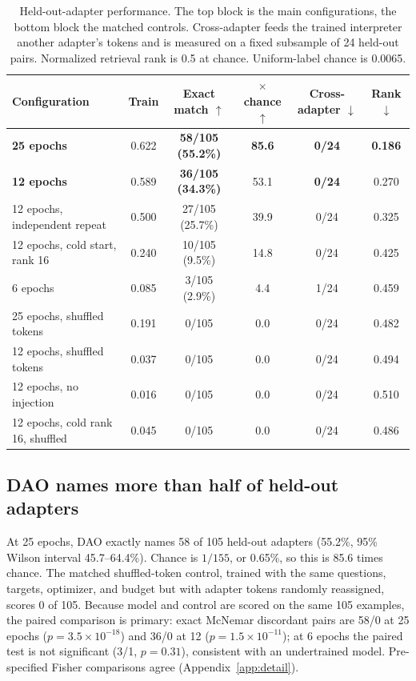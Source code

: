 \documentclass{article}
\begin{document}
\begin{table}[t]
\centering
\caption{Held-out-adapter performance. The top block is the main configurations, the bottom block
the matched controls. Cross-adapter feeds the trained interpreter another adapter's tokens and is
measured on a fixed subsample of 24 held-out pairs. Normalized retrieval rank is 0.5 at chance.
Uniform-label chance is 0.0065.}
\label{tab:main}
\small
\begin{tabular}{lccccc}
\toprule
Configuration & Train & Exact match $\uparrow$ & $\times$chance $\uparrow$ & Cross-adapter $\downarrow$ & Rank $\downarrow$ \\
\midrule
\textbf{25 epochs} & 0.622 & \textbf{58/105 (55.2\%)} & \textbf{85.6} & \textbf{0/24} & \textbf{0.186} \\
\textbf{12 epochs} & 0.589 & \textbf{36/105 (34.3\%)} & 53.1 & \textbf{0/24} & 0.270 \\
12 epochs, independent repeat & 0.500 & 27/105 (25.7\%) & 39.9 & 0/24 & 0.325 \\
12 epochs, cold start, rank 16 & 0.240 & 10/105 (9.5\%) & 14.8 & 0/24 & 0.425 \\
6 epochs & 0.085 & 3/105 (2.9\%) & 4.4 & 1/24 & 0.459 \\
\midrule
25 epochs, shuffled tokens & 0.191 & 0/105 & 0.0 & 0/24 & 0.482 \\
12 epochs, shuffled tokens & 0.037 & 0/105 & 0.0 & 0/24 & 0.494 \\
12 epochs, no injection & 0.016 & 0/105 & 0.0 & 0/24 & 0.510 \\
12 epochs, cold rank 16, shuffled & 0.045 & 0/105 & 0.0 & 0/24 & 0.486 \\
\bottomrule
\end{tabular}
\end{table}

\subsection{DAO names more than half of held-out adapters}

At 25 epochs, DAO exactly names 58 of 105 held-out adapters (55.2\%, 95\% Wilson interval
45.7--64.4\%). Chance
is $1/155$, or 0.65\%, so this is 85.6 times chance. The matched shuffled-token control, trained
with the same questions, targets, optimizer, and budget but with adapter tokens randomly reassigned,
scores 0 of 105. Because model and control are scored on the same 105 examples, the paired
comparison is primary: exact McNemar discordant pairs are 58/0 at 25 epochs
($p = 3.5\times10^{-18}$) and 36/0 at 12 ($p = 1.5\times10^{-11}$); at 6 epochs the paired test is
not significant (3/1, $p = 0.31$), consistent with an undertrained model. Pre-specified Fisher comparisons agree (Appendix~\ref{app:detail}).
\end{document}
